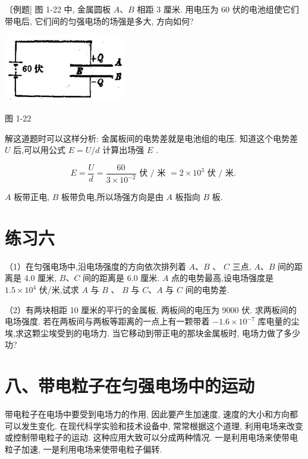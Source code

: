 \documentclass[10pt]{article}
\begin{document}
〔例题] 图 1-22 中, 金属圆板 \(A\text{、}B\) 相距 3 厘米. 用电压为 60 伏的电池组使它们带电后, 它们间的匀强电场的场强是多大, 方向如何?

\begin{center}
\includegraphics[max width=0.4\textwidth]{images/01913056-1f15-74d8-9184-9aab52c9d66b_35_655333.jpg}
\end{center}

图 1-22

解这道题时可以这样分析: 金属板间的电势差就是电池组的电压. 知道这个电势差 \(U\) 后,可以用公式 \(E = U/d\) 计算出场强 \(E\) .

\[
E = \frac{U}{d} = \frac{60}{3 \times {10}^{-2}}\text{ 伏 }/\text{ 米 } = 2 \times {10}^{3}\text{ 伏 }/\text{ 米. }
\]

\(A\) 板带正电, \(B\) 板带负电,所以场强方向是由 \(A\) 板指向 \(B\) 板.

\section*{练习六}

（1）在匀强电场中,沿电场强度的方向依次排列着 \(A\text{、}B\) 、 \(C\) 三点, \(A\text{、}B\) 间的距离是 4.0 厘米, \(B\text{、}C\) 间的距离是 6.0 厘米. \(A\) 点的电势最高,设电场强度是 \({1.5} \times {10}^{4}\) 伏/米,试求 \(A\) 与 \(B\) 、 \(B\) 与 \(C\text{、}A\) 与 \(C\) 间的电势差.

（2）有两块相距 10 厘米的平行的金属板, 两板间的电压为 9000 伏. 求两板间的电场强度. 若在两板间与两板等距离的一点上有一颗带着 \(- {1.6} \times {10}^{-7}\) 库电量的尘埃,求这颗尘埃受到的电场力. 当它移动到带正电的那块金属板时, 电场力做了多少功?

\section*{八、带电粒子在匀强电场中的运动}

带电粒子在电场中要受到电场力的作用, 因此要产生加速度, 速度的大小和方向都可以发生变化. 在现代科学实验和技术设备中, 常常根据这个道理, 利用电场来改变或控制带电粒子的运动. 这种应用大致可以分成两种情况. 一是利用电场来使带电粒子加速, 一是利用电场来使带电粒子偏转.
\end{document}
